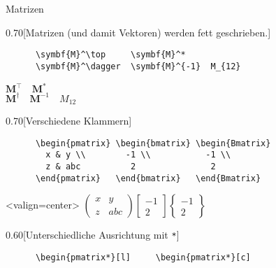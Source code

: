 \begin{frame}[fragile]{%
  Matrizen
  \hfill
}
  \begin{CodeExample}{0.70}[Matrizen (und damit Vektoren) werden fett geschrieben.]
    \begin{lstlisting}
      \symbf{M}^\top     \symbf{M}^*
      \symbf{M}^\dagger  \symbf{M}^{-1}  M_{12}
    \end{lstlisting}
  \CodeResult
    \strut
    $\symbf{M}^\top    \quad \symbf{M}^*$ \\
    $\symbf{M}^\dagger \quad \symbf{M}^{-1} \quad M_{12}$
  \end{CodeExample}

  \fontsize{8}{0.8\baselineskip}\selectfont
  \begin{CodeExample}{0.70}[Verschiedene Klammern]
    \begin{lstlisting}
      \begin{pmatrix} \begin{bmatrix} \begin{Bmatrix}
        x & y \\        -1 \\           -1 \\
        z & abc          2               2
      \end{pmatrix}   \end{bmatrix}   \end{Bmatrix}
    \end{lstlisting}
  \CodeResult<valign=center>
    $\displaystyle
      \begin{pmatrix}
        x & y \\
        z & abc
      \end{pmatrix}
      \begin{bmatrix}
        -1 \\
         2
      \end{bmatrix}
      \begin{Bmatrix}
        -1 \\
         2
      \end{Bmatrix}
    $
  \end{CodeExample}
  \begin{CodeExample}{0.60}[Unterschiedliche Ausrichtung mit \lstinline+*+]
    \begin{lstlisting}
      \begin{pmatrix*}[l]     \begin{pmatrix*}[c]

\end{lstlisting}
\end{CodeExample}
\end{frame}
